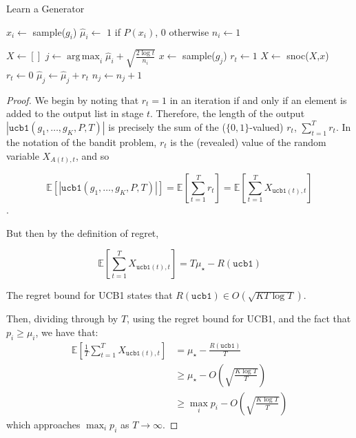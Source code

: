 \documentclass[sigconf,nonacm]{acmart}
\DeclareMathOperator*{\argmax}{arg\,max}
\begin{document}
\begin{algorithm}
    \caption{Learn a Generator}
    \label{alg:ucb1}
    \begin{algorithmic}
      \State $x_i \gets $ sample($g_i$)
      \State $\hat{\mu}_i \gets$ $1$ if $P(x_i)$, $0$ otherwise
      \State $n_i \gets 1$

      \EndFor
      \State $X \gets []$
        \State $j \gets \argmax_i \hat{\mu}_i + \sqrt{\frac{2\log t}{n_i}}$
        \State $x \gets$ sample($g_j$)
          \State $r_t \gets 1$
          \State $X \gets$ snoc($X$,$x$)
        \Else
          \State $r_t \gets 0$
        \EndIf
        \State $\hat{\mu}_j \gets \hat{\mu}_j + r_t$
        \State $n_j \gets n_j + 1$
      \EndFor
      \EndFunction
    \end{algorithmic}
\end{algorithm}



\regretthm*
\begin{proof}
We begin by noting that $r_t = 1$ in an iteration if and only if an element is added to the output list in stage $t$. Therefore, the length of the output $\left|\texttt{ucb1}(g_1,\dots,g_K,P,T)\right|$ is precisely the sum of the ($\{0,1\}$-valued) $r_t$, $\sum_{t=1}^T r_t$. In the notation of the bandit problem, $r_t$ is the (revealed) value of the random variable $X_{A(t),t}$, and so 

$$\mathbb{E}\left[\left|\texttt{ucb1}(g_1,\dots,g_K,P,T)\right|\right] = \mathbb{E}\left[\sum_{t=1}^T r_t\right] = \mathbb{E}\left[\sum_{t=1}^T X_{\texttt{ucb1}(t),t}\right]$$.

But then by the definition of regret,

$$
\mathbb{E}\left[\sum_{t=1}^T X_{\texttt{ucb1}(t),t}\right] = T\mu_{\star} - R(\texttt{ucb1})
$$

The regret bound for UCB1 \cite[Theorem 7.2]{banditbook} states that $R(\texttt{ucb1}) \in O\left(\sqrt{KT\log T}\right)$.

Then, dividing through by $T$, using the regret bound for UCB1, and the fact that $p_i \geq \mu_i$, we have that:
\begin{align*}
\mathbb{E}\left[\frac{1}{T}\sum_{t=1}^T X_{\texttt{ucb1}(t),t}\right] &= \mu_\star - \frac{R(\texttt{ucb1})}{T}\\
&\geq \mu_{\star} - O\left(\sqrt{\frac{K\log T}{T}}\right)\\
&\geq \max_i p_i - O\left(\sqrt{\frac{K\log T}{T}}\right)
\end{align*}
which approaches $\max_i p_i$ as $T \to \infty$.
\end{proof}
\end{document}
